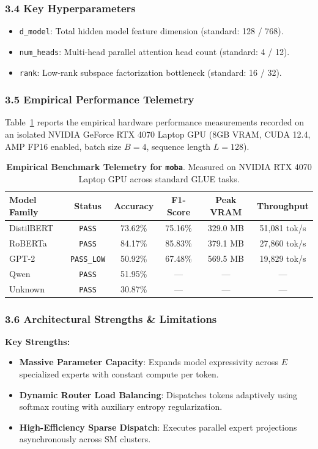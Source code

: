 \subsubsection*{3.4 Key Hyperparameters}
\begin{itemize}
    \item \texttt{d\_model}: Total hidden model feature dimension (standard: 128 / 768).
    \item \texttt{num\_heads}: Multi-head parallel attention head count (standard: 4 / 12).
    \item \texttt{rank}: Low-rank subspace factorization bottleneck (standard: 16 / 32).
\end{itemize}

\subsubsection*{3.5 Empirical Performance Telemetry}
Table~\ref{tab:telemetry_moba} reports the empirical hardware performance measurements recorded on an isolated NVIDIA GeForce RTX 4070 Laptop GPU (8GB VRAM, CUDA 12.4, AMP FP16 enabled, batch size $B=4$, sequence length $L=128$).

\begin{table}[h]
\centering
\small
\caption{\textbf{Empirical Benchmark Telemetry for \texttt{moba}}. Measured on NVIDIA RTX 4070 Laptop GPU across standard GLUE tasks.}
\label{tab:telemetry_moba}
\begin{tabular*}{\columnwidth}{@{\extracolsep{\fill}}lccccc}
\toprule
\textbf{Model Family} & \textbf{Status} & \textbf{Accuracy} & \textbf{F1-Score} & \textbf{Peak VRAM} & \textbf{Throughput} \\
\midrule
DistilBERT & \texttt{PASS} & 73.62\% & 75.16\% & 329.0 MB & 51,081 tok/s \\
RoBERTa & \texttt{PASS} & 84.17\% & 85.83\% & 379.1 MB & 27,860 tok/s \\
GPT-2 & \texttt{PASS\_LOW} & 50.92\% & 67.48\% & 569.5 MB & 19,829 tok/s \\
Qwen & \texttt{PASS} & 51.95\% & --- & --- & --- \\
Unknown & \texttt{PASS} & 30.87\% & --- & --- & --- \\
\bottomrule
\end{tabular*}
\end{table}

\subsubsection*{3.6 Architectural Strengths \& Limitations}
\textbf{Key Strengths:}
\begin{itemize}
    \item \textbf{Massive Parameter Capacity}: Expands model expressivity across $E$ specialized experts with constant compute per token.
    \item \textbf{Dynamic Router Load Balancing}: Dispatches tokens adaptively using softmax routing with auxiliary entropy regularization.
    \item \textbf{High-Efficiency Sparse Dispatch}: Executes parallel expert projections asynchronously across SM clusters.
\end{itemize}

